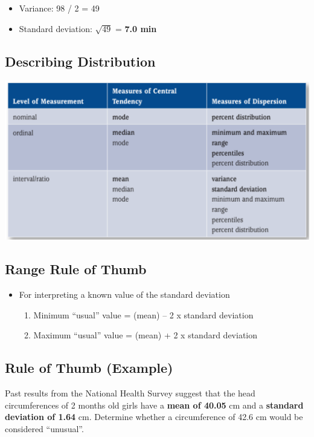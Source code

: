 \documentclass[]{article}
\providecommand{\tightlist}{%
  \setlength{\itemsep}{0pt}\setlength{\parskip}{0pt}}
\begin{document}
\begin{itemize}
\tightlist
\item
  Variance: 98 / 2 = 49
\item
  Standard deviation: \(\sqrt{49}\) = \textbf{7.0 min}
\end{itemize}

\hypertarget{describing-distribution}{%
\subsection{Describing Distribution}\label{describing-distribution}}

\includegraphics[width=0.8\linewidth]{figure/distribution}

\hypertarget{range-rule-of-thumb}{%
\subsection{Range Rule of Thumb}\label{range-rule-of-thumb}}

\begin{itemize}
\item
  For interpreting a known value of the standard deviation

  \begin{enumerate}
  \def\labelenumi{\arabic{enumi}.}
  \tightlist
  \item
    Minimum ``usual'' value = (mean) -- 2 x standard deviation
  \item
    Maximum ``usual'' value = (mean) + 2 x standard deviation
  \end{enumerate}
\end{itemize}

\hypertarget{rule-of-thumb-example}{%
\subsection{Rule of Thumb (Example)}\label{rule-of-thumb-example}}

Past results from the National Health Survey suggest that the head
circumferences of 2 months old girls have a {\textbf{mean of 40.05}} cm
and a {\textbf{standard deviation of 1.64}} cm. Determine whether a
circumference of 42.6 cm would be considered ``unusual''.
\end{document}
